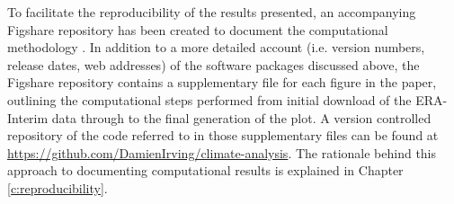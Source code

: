 To facilitate the reproducibility of the results presented, an accompanying Figshare repository has been created to document the computational methodology \citep{IrvingFigshare2016}. In addition to a more detailed account (i.e. version numbers, release dates, web addresses) of the software packages discussed above, the Figshare repository contains a supplementary file for each figure in the paper, outlining the computational steps performed from initial download of the ERA-Interim data through to the final generation of the plot. A version controlled repository of the code referred to in those supplementary files can be found at \url{https://github.com/DamienIrving/climate-analysis}. The rationale behind this approach to documenting computational results is explained in Chapter \ref{c:reproducibility}.
